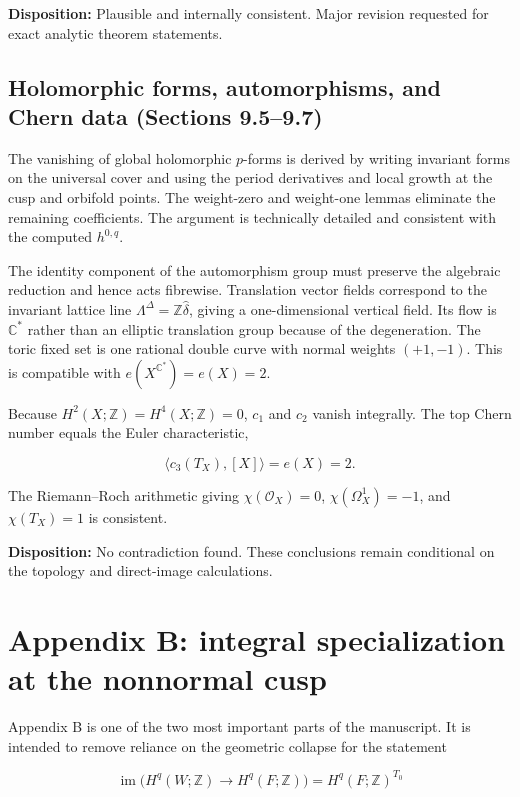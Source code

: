 \documentclass[
  10pt,
  letterpaper,
]{article}
\newcommand{\Z}{\mathbb Z}
\newcommand{\C}{\mathbb C}
\newcommand{\cO}{\mathcal O}
\newcommand{\im}{\operatorname{im}}
\begin{document}
\textbf{Disposition:} Plausible and internally consistent. Major
revision requested for exact analytic theorem statements.

\subsection{Holomorphic forms, automorphisms, and Chern data (Sections
9.5--9.7)}\label{holomorphic-forms-automorphisms-and-chern-data-sections-9.59.7}

The vanishing of global holomorphic \(p\)-forms is derived by writing
invariant forms on the universal cover and using the period derivatives
and local growth at the cusp and orbifold points. The weight-zero and
weight-one lemmas eliminate the remaining coefficients. The argument is
technically detailed and consistent with the computed \(h^{0,q}\).

The identity component of the automorphism group must preserve the
algebraic reduction and hence acts fibrewise. Translation vector fields
correspond to the invariant lattice line
\(\Lambda^\Delta=\Z\widehat\delta\), giving a one-dimensional vertical
field. Its flow is \(\C^*\) rather than an elliptic translation group
because of the degeneration. The toric fixed set is one rational double
curve with normal weights \((+1,-1)\). This is compatible with
\(e(X^{\C^*})=e(X)=2\).

Because \(H^2(X;\Z)=H^4(X;\Z)=0\), \(c_1\) and \(c_2\) vanish
integrally. The top Chern number equals the Euler characteristic,

\[
\langle c_3(T_X),[X]\rangle=e(X)=2.
\]

The Riemann--Roch arithmetic giving \(\chi(\cO_X)=0\),
\(\chi(\Omega_X^1)=-1\), and \(\chi(T_X)=1\) is consistent.

\textbf{Disposition:} No contradiction found. These conclusions remain
conditional on the topology and direct-image calculations.

\section{Appendix B: integral specialization at the nonnormal
cusp}\label{appendix-b-integral-specialization-at-the-nonnormal-cusp}

Appendix B is one of the two most important parts of the manuscript. It
is intended to remove reliance on the geometric collapse for the
statement

\[
\im\bigl(H^q(W;\Z)\to H^q(F;\Z)\bigr)
=H^q(F;\Z)^{T_0}
\]
\end{document}
